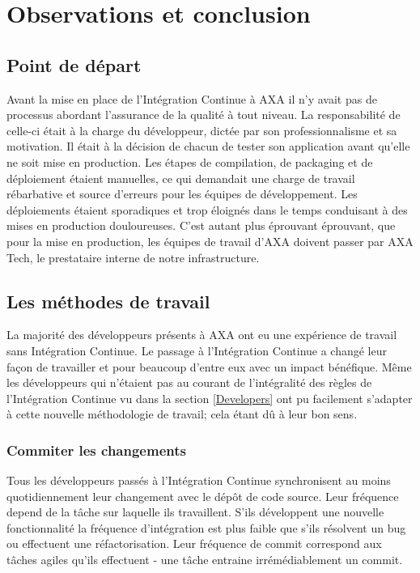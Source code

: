   \section{Observations et conclusion}
    \subsection{Point de départ}
    Avant la mise en place de l'Intégration Continue à AXA il n'y avait pas de processus abordant l'assurance de la qualité à tout niveau. La responsabilité de celle-ci était à la charge du développeur, dictée par son professionnalisme et sa motivation. Il était à la décision de chacun de tester son application avant qu'elle ne soit mise en production. Les étapes de compilation, de packaging et de déploiement étaient manuelles, ce qui demandait une charge de travail rébarbative et source d'erreurs pour les équipes de développement. Les déploiements étaient sporadiques et trop éloignés dans le temps conduisant à des mises en production douloureuses. C'est autant plus éprouvant éprouvant, que pour la mise en production, les équipes de travail d'AXA doivent passer par AXA Tech, le prestataire interne de notre infrastructure.\\

    \subsection{Les méthodes de travail}
    La majorité des développeurs présents à AXA ont eu une expérience de travail sans Intégration Continue. Le passage à l'Intégration Continue a changé leur façon de travailler et pour beaucoup d'entre eux avec un impact bénéfique. Même les développeurs qui n'étaient pas au courant de l'intégralité des règles de l'Intégration Continue vu dans la section \ref{Developers} ont pu facilement s'adapter à cette nouvelle méthodologie de travail; cela étant dû à leur bon sens.

      \subsubsection{Commiter les changements}
      Tous les développeurs passés à l'Intégration Continue synchronisent au moins quotidiennement leur changement avec le dépôt de code source. Leur fréquence depend de la tâche sur laquelle ils travaillent. S'ils développent une nouvelle fonctionnalité la fréquence d'intégration est plus faible que s'ils résolvent un bug ou effectuent une réfactorisation. Leur fréquence de commit correspond aux tâches agiles qu'ils effectuent - une tâche entraine irrémédiablement un commit.

